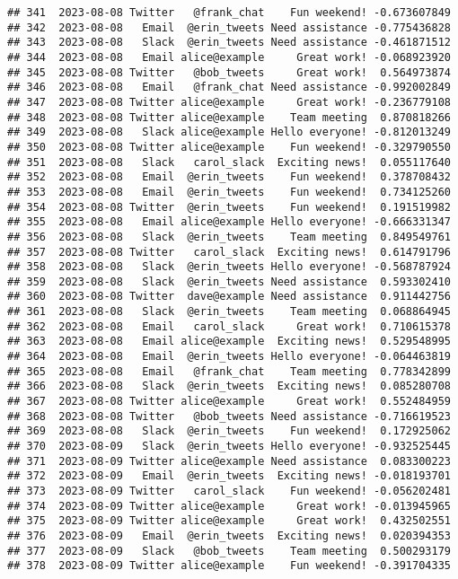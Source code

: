 \documentclass[
]{article}
\begin{document}
\begin{verbatim}
## 341  2023-08-08 Twitter   @frank_chat    Fun weekend! -0.673607849
## 342  2023-08-08   Email  @erin_tweets Need assistance -0.775436828
## 343  2023-08-08   Slack  @erin_tweets Need assistance -0.461871512
## 344  2023-08-08   Email alice@example     Great work! -0.068923920
## 345  2023-08-08 Twitter   @bob_tweets     Great work!  0.564973874
## 346  2023-08-08   Email   @frank_chat Need assistance -0.992002849
## 347  2023-08-08 Twitter alice@example     Great work! -0.236779108
## 348  2023-08-08 Twitter alice@example    Team meeting  0.870818266
## 349  2023-08-08   Slack alice@example Hello everyone! -0.812013249
## 350  2023-08-08 Twitter alice@example    Fun weekend! -0.329790550
## 351  2023-08-08   Slack   carol_slack  Exciting news!  0.055117640
## 352  2023-08-08   Email  @erin_tweets    Fun weekend!  0.378708432
## 353  2023-08-08   Email  @erin_tweets    Fun weekend!  0.734125260
## 354  2023-08-08 Twitter  @erin_tweets    Fun weekend!  0.191519982
## 355  2023-08-08   Email alice@example Hello everyone! -0.666331347
## 356  2023-08-08   Slack  @erin_tweets    Team meeting  0.849549761
## 357  2023-08-08 Twitter   carol_slack  Exciting news!  0.614791796
## 358  2023-08-08   Slack  @erin_tweets Hello everyone! -0.568787924
## 359  2023-08-08   Slack  @erin_tweets Need assistance  0.593302410
## 360  2023-08-08 Twitter  dave@example Need assistance  0.911442756
## 361  2023-08-08   Slack  @erin_tweets    Team meeting  0.068864945
## 362  2023-08-08   Email   carol_slack     Great work!  0.710615378
## 363  2023-08-08   Email alice@example  Exciting news!  0.529548995
## 364  2023-08-08   Email  @erin_tweets Hello everyone! -0.064463819
## 365  2023-08-08   Email   @frank_chat    Team meeting  0.778342899
## 366  2023-08-08   Slack  @erin_tweets  Exciting news!  0.085280708
## 367  2023-08-08 Twitter alice@example     Great work!  0.552484959
## 368  2023-08-08 Twitter   @bob_tweets Need assistance -0.716619523
## 369  2023-08-08   Slack  @erin_tweets    Fun weekend!  0.172925062
## 370  2023-08-09   Slack  @erin_tweets Hello everyone! -0.932525445
## 371  2023-08-09 Twitter alice@example Need assistance  0.083300223
## 372  2023-08-09   Email  @erin_tweets  Exciting news! -0.018193701
## 373  2023-08-09 Twitter   carol_slack    Fun weekend! -0.056202481
## 374  2023-08-09 Twitter alice@example     Great work! -0.013945965
## 375  2023-08-09 Twitter alice@example     Great work!  0.432502551
## 376  2023-08-09   Email  @erin_tweets  Exciting news!  0.020394353
## 377  2023-08-09   Slack   @bob_tweets    Team meeting  0.500293179
## 378  2023-08-09 Twitter alice@example    Fun weekend! -0.391704335

\end{verbatim}
\end{document}
